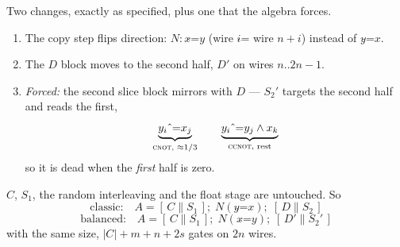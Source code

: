 \documentclass[11pt]{article}
\newcommand{\CNOT}{\textsc{cnot}}
\newcommand{\CCNOT}{\textsc{ccnot}}
\newcommand{\xor}{\mathbin{\hat{}}\mathord{=}}
\begin{document}
Two changes, exactly as specified, plus one that the algebra forces.

\begin{enumerate}
\item The copy step flips direction: $N: x \xor y$ (wire $i \xor$ wire $n{+}i$)
      instead of $y \xor x$.
\item The $D$ block moves to the second half, $D'$ on wires $n..2n{-}1$.
\item \emph{Forced:} the second slice block mirrors with $D$ --- $S_2'$ targets
      the second half and reads the first,
      \[
        \underbrace{y_i \xor x_j}_{\text{\CNOT, }\approx 1/3}
        \qquad
        \underbrace{y_i \xor y_j \wedge x_k}_{\text{\CCNOT, rest}}
      \]
      so it is dead when the \emph{first} half is zero.
\end{enumerate}

\noindent $C$, $S_1$, the random interleaving and the float stage are
untouched. So
\[
\text{classic:}\quad A = [\, C \parallel S_1 \,];\; N(y \xor x);\; [\, D \parallel S_2 \,]
\]
\[
\text{balanced:}\quad A = [\, C \parallel S_1 \,];\; N(x \xor y);\; [\, D' \parallel S_2' \,]
\]
with the same size, $\lvert C\rvert + m + n + 2s$ gates on $2n$ wires.
\end{document}
